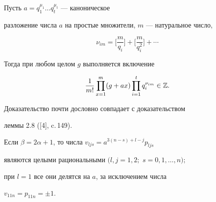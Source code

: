  


\begin{lem} 


Пусть $a=q^{\mu_1}_1\dotsc q^{\mu_t}_t$ --- каноническое 


разложение числа $a$ на простые множители, $m$ --- натуральное число, 


$$ 


\nu_{im}=\bigg[\frac{m}{q_i}\bigg]+\bigg[\frac{m}{q^2_i} 


\bigg]+\dotsb 


$$ 


Тогда при любом целом $g$ выполняется включение 


$$ 


\frac{1}{m!}\prod^m_{x=1}(g+ax)\prod^t_{i=1} 


q^{\nu_{im}}_i\in\Bbb Z. 


$$ 


\end{lem} 


 


Доказательство почти дословно совпадает с доказательством 


леммы 2.8 ([4], c.\,149). 


 


\begin{lem} 


Если $\beta=2\alpha+1$, то числа $v_{ljs}=a^{3(n-s)+l-j}p_{ljs}$ 


являются целыми рациональными $(l,j=1,2;$ $s=0,1,\dotsc,n);$ 


при $l=1$ все они делятся на $a$, за исключением числа 


$v_{11n}=p_{11n}=\pm1$. 


\end{lem} 


 


